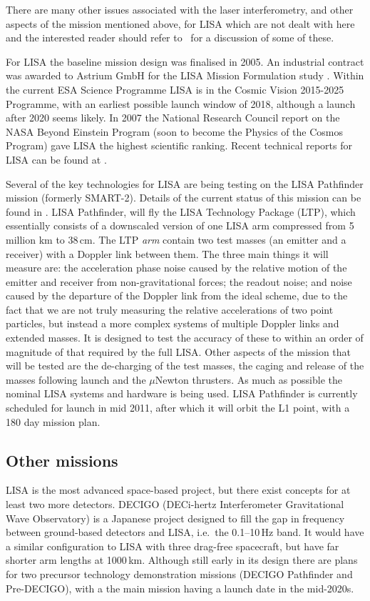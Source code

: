 \documentclass{article}
\begin{document}
There are many other issues associated with the laser interferometry, and other
aspects of the mission mentioned above, for LISA which are not dealt with here
and the interested reader should refer to~\cite{Houghetal, Jennrich:2009,
Johann:2008} for a discussion of some of these.

For LISA the baseline mission design was finalised in 2005. An industrial
contract was awarded to Astrium GmbH for the LISA Mission Formulation study
\cite{Johann:2008}. Within the current ESA Science Programme LISA is in the
Cosmic Vision 2015-2025 Programme, with an earliest possible launch window of
2018, although a launch after 2020 seems likely. In 2007 the National Research
Council report on the NASA Beyond Einstein Program (soon to become the Physics
of the Cosmos Program) gave LISA the highest scientific ranking. Recent
technical reports for LISA can be found at \cite{LISATechReports}.

Several of the key technologies for LISA are being testing on the LISA
Pathfinder mission (formerly SMART-2). Details of the current status of this
mission can be found in \cite{Armano:2009}. LISA Pathfinder, will fly the
LISA Technology Package (LTP), which essentially consists of a downscaled
version of one LISA arm compressed from 5 million km to 38\,cm. The LTP {\it arm}
contain two test masses (an emitter and a receiver) with a Doppler link
between them. The three main things it will measure are: the acceleration phase
noise caused by the relative motion of the emitter and receiver from
non-gravitational forces; the readout noise; and noise caused by the departure
of the Doppler link from the ideal scheme, due to the fact that we are not
truly measuring the relative accelerations of two point particles, but instead
a more complex systems of multiple Doppler links and extended masses. It is
designed to test the accuracy of these to within an order of magnitude of that required by
the full LISA. Other aspects of the mission that will be tested are the
de-charging of the test masses, the caging and release of the masses following
launch and the $\mu$Newton thrusters. As much as possible the nominal LISA
systems and hardware is being used. LISA Pathfinder is currently scheduled for
launch in mid 2011, after which it will orbit the L1 point, with a 180 day
mission plan.

\subsection{Other missions}
LISA is the most advanced space-based project, but there exist concepts for at
least two more detectors. DECIGO (DECi-hertz Interferometer Gravitational Wave
Observatory) \cite{Sato:2009} is a Japanese project designed to fill the gap in
frequency between ground-based detectors and LISA, i.e.\ the 0.1--10\,Hz band. It
would have a similar configuration to LISA with three drag-free spacecraft, but
have far shorter arm lengths at 1000\,km. Although still early in its design
there are plans for two precursor technology demonstration missions (DECIGO
Pathfinder \cite{Ando:2009} and Pre-DECIGO), with a the main mission having a
launch date in the mid-2020s.
\end{document}
